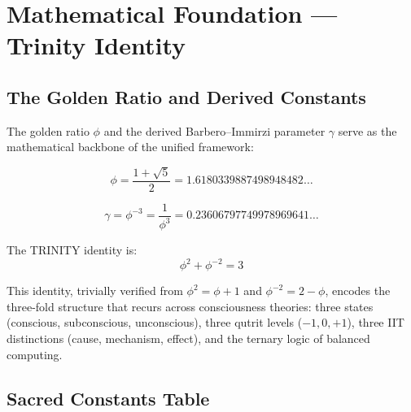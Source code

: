 \documentclass[12pt,a4paper]{article}
\begin{document}
\section{Mathematical Foundation --- Trinity Identity}
\label{sec:math_foundation}

\subsection{The Golden Ratio and Derived Constants}

The golden ratio $\phi$ and the derived Barbero--Immirzi parameter $\gamma$
serve as the mathematical backbone of the unified framework:

\begin{equation}
\phi = \frac{1 + \sqrt{5}}{2} = 1.6180339887498948482\ldots
\label{eq:phi}
\end{equation}

\begin{equation}
\gamma = \phi^{-3} = \frac{1}{\phi^3} = 0.23606797749978969641\ldots
\label{eq:gamma}
\end{equation}

The TRINITY identity is:
\begin{equation}
\boxed{\phi^2 + \phi^{-2} = 3}
\label{eq:trinity}
\end{equation}

\noindent
This identity, trivially verified from $\phi^2 = \phi + 1$ and
$\phi^{-2} = 2 - \phi$, encodes the three-fold structure that recurs across
consciousness theories: three states (conscious, subconscious, unconscious),
three qutrit levels ($-1, 0, +1$), three IIT distinctions (cause, mechanism,
effect), and the ternary logic of balanced computing.

\subsection{Sacred Constants Table}
\end{document}
